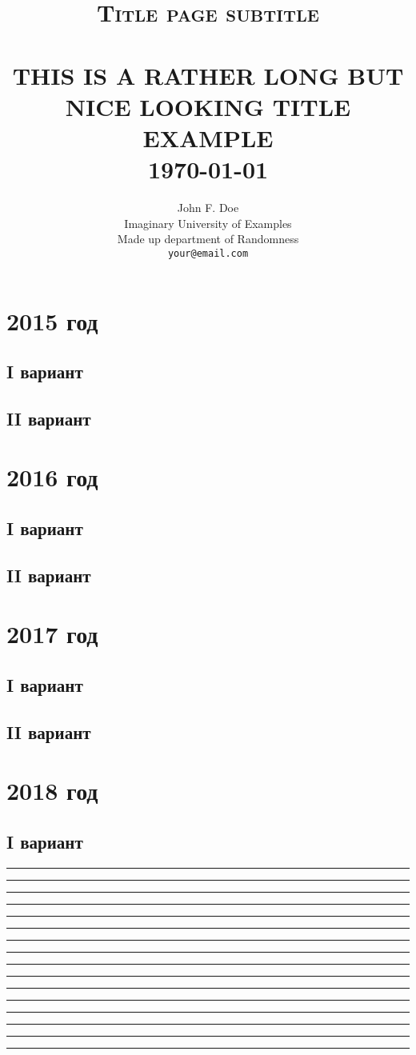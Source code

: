 \documentclass[11 pt,russian]{book}
\title{	\normalsize \textsc{Title page subtitle} 	%
		 	\\[2.0cm]								%
			\HRule{0.5pt} \\						%
			\LARGE \textbf{\uppercase{This is a rather long but nice looking title example}}	%
			\HRule{2pt} \\ [0.5cm]		%
			\normalsize \today			%
		}
\author{
		John F. Doe\\	
		Imaginary University of Examples\\	
		Made up department of Randomness\\
        \texttt{your@email.com} \\
}
\makeatletter
\newcounter{num}
\def\printtitle{%
    {\centering \@title\par}}
\def\printauthor{%
    {\centering \large \@author}}
\makeatother
\begin{document}


\thispagestyle{empty}		%

\printtitle					%
  	\vfill
\printauthor				%
\newpage


\newpage

\section{2015 год}
\subsection{I вариант}
\subsection{II вариант}

\section{2016 год}
\subsection{I вариант}
\subsection{II вариант}

\section{2017 год}
\subsection{I вариант}
\subsection{II вариант}


\section{2018 год}
\subsection{I вариант}

\hrule

\hrule

\hrule

\hrule

\hrule

\hrule

\hrule

\hrule

\hrule

\hrule

\hrule

\hrule

\hrule

\hrule

\hrule

\hrule

\end{document}
